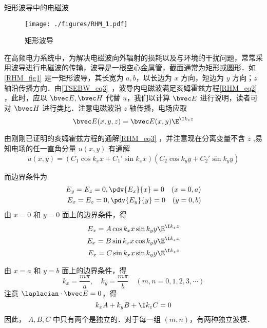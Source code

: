 \begin{example}{矩形波导中的电磁波}
\begin{figure}[ht]
\centering
\texttt{[image: ./figures/RHM\_1.pdf]}
\caption{矩形波导} \label{RHM_fig1}
\end{figure}
在高频电力系统中，为解决电磁波向外辐射的损耗以及与环境的干扰问题，常常采用波导进行电磁波的传输，波导是一根空心金属管，截面通常为矩形或圆形．如\autoref{RHM_fig1} 是一矩形波导，其长宽为 $a,b$，以长边为 $x$ 方向，短边为 $y$ 方向；$z$ 轴沿传播方向．由\autoref{TSEBW_eq3}~，波导内电磁波满足亥姆霍兹方程\autoref{RHM_eq2} ，此时，应以 $\bvec E,\bvec H$ 代替 $u$，我们以计算 $\bvec E$ 进行说明，读者可对 $\bvec H$ 进行类比．注意电磁波沿 $z$ 轴传播，电场应取
\begin{equation}
\bvec E(x,y,z)=\bvec E(x,y)\E^{\I k_z z}
\end{equation}

由刚刚已证明的亥姆霍兹方程的通解\autoref{RHM_eq3} ，并注意现在分离变量不含 $z$ ,易知电场的任一直角分量 $u(x,y)$ 有通解
\begin{equation}
u(x,y)=(C_1\cos k_xx+C_1'\sin k_xx)(C_2\cos k_yy+C_2'\sin k_yy)
\end{equation}

而边界条件为
\begin{equation}
\begin{aligned}
E_y=E_z=0,\pdv{E_x}{x}=0\quad(x=0,a)\\
E_x=E_z=0,\pdv{E_y}{y}=0\quad(y=0,b)
\end{aligned}
\end{equation}
由 $x=0$ 和 $y=0$ 面上的边界条件，得
\begin{equation}
\begin{aligned}
E_x=A\cos k_x x\sin k_yy\E^{\I k_zz} \\
E_x=B\sin k_x x\cos k_yy\E^{\I k_zz} \\
E_x=C\sin k_x x\sin k_yy\E^{\I k_zz} 
\end{aligned}
\end{equation}
 
由 $x=a$ 和 $y=b$ 面上的边界条件，得 
\begin{equation}
k_x=\frac{m\pi}{a},\quad k_y=\frac{m\pi}{b}\quad(m,n=0,1,2,3,\cdots)
\end{equation}
注意 $\laplacian \cdot\bvec E=0$，得
\begin{equation}
k_xA+k_yB+\I k_zC=0
\end{equation}
因此， $A,B,C$ 中只有两个是独立的．对于每一组 $(m,n)$，有两种独立波模．
\end{example}
